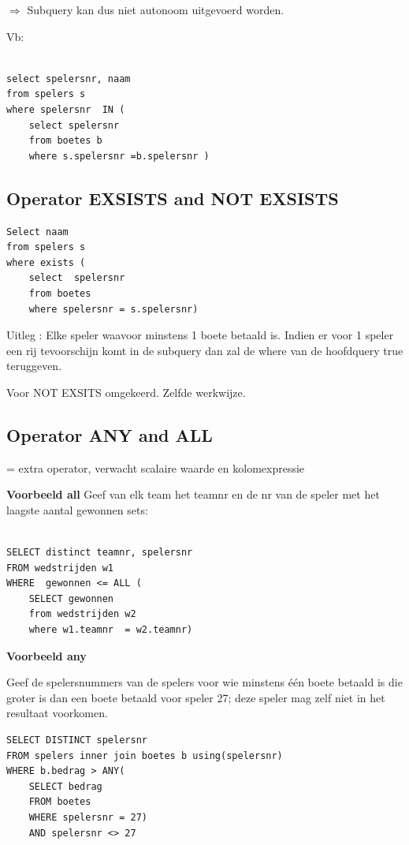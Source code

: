 \noindent $\Rightarrow$ Subquery kan dus niet autonoom uitgevoerd worden.

Vb: 
\begin{verbatim}

select spelersnr, naam 
from spelers s 
where spelersnr  IN (
    select spelersnr 
    from boetes b
    where s.spelersnr =b.spelersnr )
\end{verbatim}

\subsection{Operator EXSISTS and NOT EXSISTS}

\begin{verbatim}
Select naam 
from spelers s 
where exists (
    select  spelersnr 
    from boetes 
    where spelersnr = s.spelersnr)
\end{verbatim}

Uitleg :  Elke speler waavoor minstens 1 boete betaald is. Indien er voor 1 speler een rij tevoorschijn komt in de subquery dan zal de where van de hoofdquery true teruggeven.

Voor NOT EXSITS omgekeerd. Zelfde werkwijze.


\subsection{Operator ANY and ALL}

= extra operator, verwacht scalaire waarde en kolomexpressie

\textbf{Voorbeeld all}
Geef van elk team het teamnr en de nr van de speler met het laagste aantal gewonnen sets:

\begin{verbatim}

SELECT distinct teamnr, spelersnr 
FROM wedstrijden w1
WHERE  gewonnen <= ALL (
    SELECT gewonnen 
    from wedstrijden w2 
    where w1.teamnr  = w2.teamnr)
\end{verbatim}


\textbf{Voorbeeld any}

Geef de spelersnummers van de spelers voor wie minstens één boete betaald is die groter is dan een boete betaald voor speler 27; deze speler mag zelf niet in het resultaat voorkomen.

\begin{verbatim}
SELECT DISTINCT spelersnr
FROM spelers inner join boetes b using(spelersnr)
WHERE b.bedrag > ANY(
    SELECT bedrag 
    FROM boetes 
    WHERE spelersnr = 27)
    AND spelersnr <> 27
\end{verbatim}

